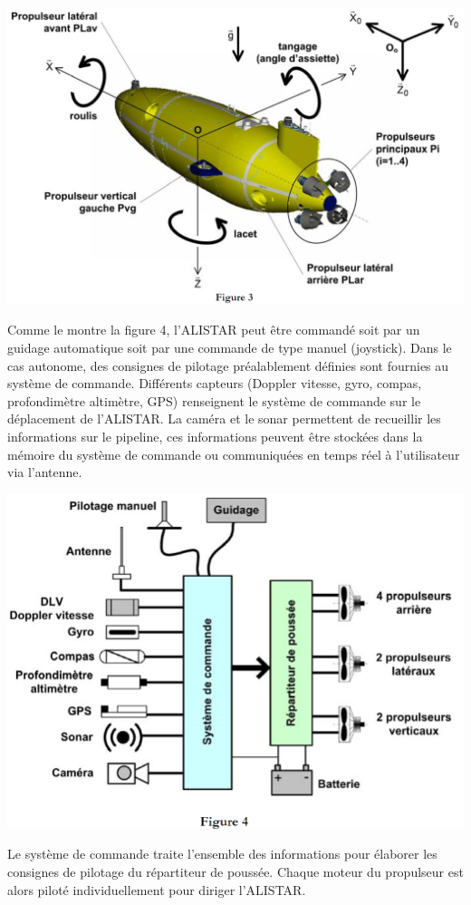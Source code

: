 \documentclass[11pt,oneside]{article}
\begin{document}
{\begin{center}
\includegraphics[width=.8\textwidth]{png/fig_03}
\end{center}


Comme le montre la figure 4, l’ALISTAR peut être commandé soit par un guidage automatique soit par une commande de type manuel (joystick). Dans le cas autonome, des consignes de pilotage préalablement définies sont fournies au système de commande. Différents capteurs (Doppler vitesse, gyro, compas, profondimètre altimètre, GPS) renseignent le système de commande sur le déplacement de l’ALISTAR. La caméra et le sonar permettent de recueillir les informations sur le pipeline, ces informations peuvent être stockées dans la mémoire du système de commande ou communiquées en temps réel à l’utilisateur via l’antenne.

\begin{center}
\includegraphics[width=.8\textwidth]{png/fig_04}
\end{center}

Le système de commande traite l’ensemble des informations pour élaborer les consignes de pilotage du répartiteur de poussée. Chaque moteur du propulseur est alors piloté individuellement pour diriger l’ALISTAR.

}
\end{document}
